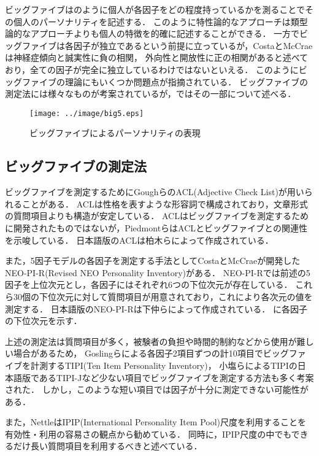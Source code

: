 ビッグファイブはのように個人が各因子をどの程度持っているかを測ることでその個人のパーソナリティを記述する．
このように特性論的なアプローチは類型論的なアプローチよりも個人の特徴を的確に記述することができる．
一方でビッグファイブは各因子が独立であるという前提に立っているが，CostaとMcCrae\cite{neo-pi-r}は神経症傾向と誠実性に負の相関，
外向性と開放性に正の相関があると述べており，全ての因子が完全に独立しているわけではないといえる\cite{eysenck-handbook}．
このようにビッグファイブの理論にもいくつか問題点が指摘されている．
ビッグファイブの測定法には様々なものが考案されているが，ではその一部について述べる．

\begin{figure}[tb]
    \centering
    \texttt{[image: ../image/big5.eps]}
    \caption{ビッグファイブによるパーソナリティの表現}
    \label{fig:big5}
\end{figure}

\subsection{ビッグファイブの測定法}
\label{sec:mesure}
ビッグファイブを測定するためにGoughら\cite{acl}のACL(Adjective Check List)が用いられることがある．
ACLは性格を表すような形容詞で構成されており，文章形式の質問項目よりも構造が安定している．
ACLはビッグファイブを測定するために開発されたものではないが，Piedmontら\cite{big5-acl}はACLとビッグファイブとの関連性を示唆している．
日本語版のACLは柏木ら\cite{acl-ja}によって作成されている．

また，5因子モデルの各因子を測定する手法としてCostaとMcCrae\cite{neo-pi-r}が開発したNEO-PI-R(Revised NEO Personality Inventory)がある．
NEO-PI-Rでは前述の5因子を上位次元とし，各因子にはそれぞれ6つの下位次元が存在している．
これら30個の下位次元に対して質問項目が用意されており，これにより各次元の値を測定する．
日本語版のNEO-PI-Rは下仲ら\cite{neo-pi-r-ja}によって作成されている．
に各因子の下位次元を示す．

上述の測定法は質問項目が多く，被験者の負担や時間的制約などから使用が難しい場合があるため，
Goslingら\cite{tipi}による各因子2項目ずつの計10項目でビッグファイブを計測するTIPI(Ten Item Personality Inventory)，
小塩ら\cite{tipi-j}によるTIPIの日本語版であるTIPI-Jなど少ない項目でビッグファイブを測定する方法も多く考案された．
しかし，このような短い項目では因子が十分に測定できない可能性がある．

また，Nettle\cite{daniel}はIPIP(International Personality Item Pool)尺度を利用することを有効性・利用の容易さの観点から勧めている．
同時に，IPIP尺度の中でもできるだけ長い質問項目を利用するべきと述べている．

